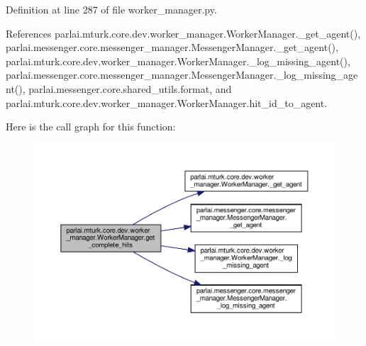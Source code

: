 Definition at line 287 of file worker\+\_\+manager.\+py.



References parlai.\+mturk.\+core.\+dev.\+worker\+\_\+manager.\+Worker\+Manager.\+\_\+get\+\_\+agent(), parlai.\+messenger.\+core.\+messenger\+\_\+manager.\+Messenger\+Manager.\+\_\+get\+\_\+agent(), parlai.\+mturk.\+core.\+dev.\+worker\+\_\+manager.\+Worker\+Manager.\+\_\+log\+\_\+missing\+\_\+agent(), parlai.\+messenger.\+core.\+messenger\+\_\+manager.\+Messenger\+Manager.\+\_\+log\+\_\+missing\+\_\+agent(), parlai.\+messenger.\+core.\+shared\+\_\+utils.\+format, and parlai.\+mturk.\+core.\+dev.\+worker\+\_\+manager.\+Worker\+Manager.\+hit\+\_\+id\+\_\+to\+\_\+agent.

Here is the call graph for this function\+:
\nopagebreak
\begin{figure}[H]
\begin{center}
\leavevmode
\includegraphics[width=350pt]{classparlai_1_1mturk_1_1core_1_1dev_1_1worker__manager_1_1WorkerManager_a21d7624c63aa1e6540db8d551a1744d2_cgraph}
\end{center}
\end{figure}
\mbox{\label{classparlai_1_1mturk_1_1core_1_1dev_1_1worker__manager_1_1WorkerManager_a25fea0a63f8cb6ba522162e7e219e945}} 

